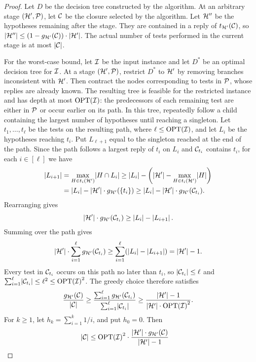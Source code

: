 \begin{proof}
Let $D$ be the decision tree constructed by the algorithm. At an arbitrary stage $(\mathcal{H}',\mathcal{P})$, let $\mathcal{C}$ be the closure selected by the algorithm.
Let $\mathcal{H}''$ be the hypotheses remaining after the stage. They are contained in a reply of $t_{\mathcal{H}'}\mathopen{}\left( \mathcal{C} \right)$, so $\mathopen{}\left| \mathcal{H}'' \right|\leq \mathopen{}\left( 1-g_{\mathcal{H}'}(\mathcal{C}) \right)\cdot\mathopen{}\left| \mathcal{H}' \right|$.
The actual number of tests performed in the current stage is at most $\mathopen{}\left| \mathcal{C} \right|$.

For the worst-case bound, let $\mathcal{I}$ be the input instance and let $D^*$ be an optimal decision tree for $\mathcal{I}$. At a stage $(\mathcal{H}',\mathcal{P})$, restrict $D^*$ to $\mathcal{H}'$ by removing branches inconsistent with $\mathcal{H}'$. Then contract the nodes corresponding to tests in $\mathcal{P}$, whose replies are already known. The resulting tree is feasible for the restricted instance and has depth at most $\textup{\text{OPT}}\mathopen{}\left( \mathcal{I} \right)$: the predecessors of each remaining test are either in $\mathcal{P}$ or occur earlier on its path. In this tree, repeatedly follow a child containing the largest number of hypotheses until reaching a singleton. Let $t_1,\ldots,t_\ell$ be the tests on the resulting path, where $\ell\leq\textup{\text{OPT}}\mathopen{}\left( \mathcal{I} \right)$, and let $L_i$ be the hypotheses reaching $t_i$. Put $L_{\ell+1}$ equal to the singleton reached at the end of the path. Since the path follows a largest reply of $t_i$ on $L_i$ and $\mathcal{C}_{t_i}$ contains $t_i$, for each $i\in[\ell]$ we have
\begin{align*}
    \mathopen{}\left| L_{i+1} \right|
    &=\max_{H\in t_i\mathopen{}\left( \mathcal{H}' \right)}\mathopen{}\left| H\cap L_i \right|
    \geq\mathopen{}\left| L_i \right|-\mathopen{}\left( \mathopen{}\left| \mathcal{H}' \right|-\max_{H\in t_i\mathopen{}\left( \mathcal{H}' \right)}\mathopen{}\left| H \right| \right)\\
    &=\mathopen{}\left| L_i \right|-\mathopen{}\left| \mathcal{H}' \right|\cdot g_{\mathcal{H}'}(\mathopen{}\left\{ t_i \right\})
    \geq\mathopen{}\left| L_i \right|-\mathopen{}\left| \mathcal{H}' \right|\cdot g_{\mathcal{H}'}(\mathcal{C}_{t_i}).
\end{align*}
Rearranging gives
\[
    \mathopen{}\left| \mathcal{H}' \right|\cdot g_{\mathcal{H}'}(\mathcal{C}_{t_i})
    \geq\mathopen{}\left| L_i \right|-\mathopen{}\left| L_{i+1} \right|.
\]
Summing over the path gives
\[
    \mathopen{}\left| \mathcal{H}' \right|\cdot\sum_{i=1}^{\ell}g_{\mathcal{H}'}(\mathcal{C}_{t_i})
    \geq\sum_{i=1}^{\ell}\mathopen{}\left( \mathopen{}\left| L_i \right|-\mathopen{}\left| L_{i+1} \right| \right)
    =\mathopen{}\left| \mathcal{H}' \right|-1.
\]
Every test in $\mathcal{C}_{t_i}$ occurs on this path no later than $t_i$, so $\mathopen{}\left| \mathcal{C}_{t_i} \right|\leq\ell$ and $\sum_{i=1}^{\ell}\mathopen{}\left| \mathcal{C}_{t_i} \right|\leq\ell^2\leq\textup{\text{OPT}}\mathopen{}\left( \mathcal{I} \right)^2$. The greedy choice therefore satisfies
\[
    \frac{g_{\mathcal{H}'}(\mathcal{C})}{\mathopen{}\left| \mathcal{C} \right|}\geq
    \frac{\sum_{i=1}^{\ell}g_{\mathcal{H}'}(\mathcal{C}_{t_i})}{\sum_{i=1}^{\ell}\mathopen{}\left| \mathcal{C}_{t_i} \right|}
    \geq\frac{\mathopen{}\left| \mathcal{H}' \right|-1}{\mathopen{}\left| \mathcal{H}' \right|\cdot\textup{\text{OPT}}\mathopen{}\left( \mathcal{I} \right)^2}.
\]
For $k\geq1$, let $h_k=\sum_{i=1}^{k}1/i$, and put $h_0=0$. Then
\begin{align*}
    \spr{\cC}
    &\leq\OPT\br{\cI}^2\cdot\frac{\spr{\cH'}\cdot g_{\cH'}(\cC)}{\spr{\cH'}-1}

\end{align*}
\end{proof}

